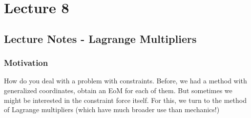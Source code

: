 \documentclass[../PHYS306Notes.tex]{subfiles}
\begin{document}
\section{Lecture 8}
\subsection{Lecture Notes - Lagrange Multipliers}
\subsubsection{Motivation}
How do you deal with a problem with constraints. Before, we had a method with generalized coordinates, obtain an EoM for each of them. But sometimes we might be interested in the constraint force itself. For this, we turn to the method of Lagrange multipliers (which have much broader use than mechanics!)
\end{document}

